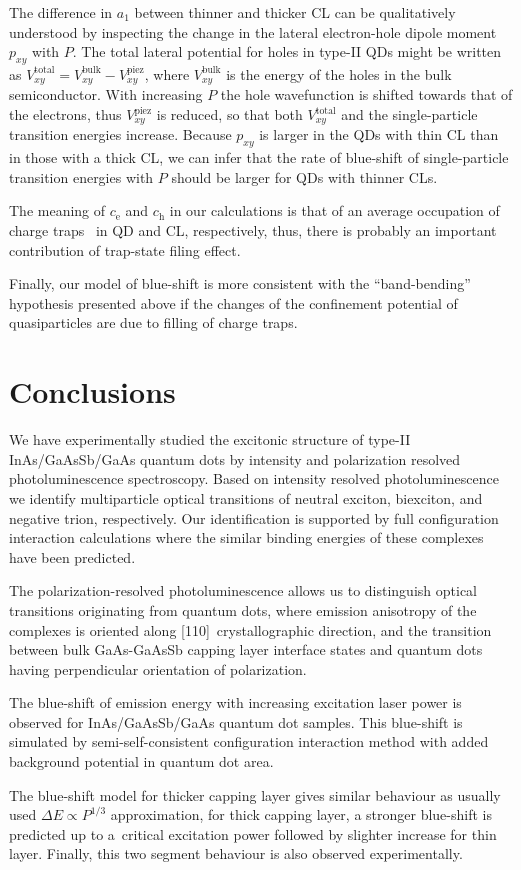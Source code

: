 The difference in $a_1$ between thinner and thicker CL can be qualitatively understood by inspecting the change in the lateral electron-hole dipole moment $p_{xy}$ with $P$. The total lateral potential for holes in type-II QDs might be written as $V_{xy}^\mathrm{total}=V_{xy}^\mathrm{bulk}-V^{\mathrm{piez}}_{xy}$, where $V^{\mathrm{bulk}}_{xy}$ is the energy of the holes in the bulk semiconductor. With increasing $P$ the hole wavefunction is shifted towards that of the electrons, thus $V^{\mathrm{piez}}_{xy}$ is reduced, so that both $V^{\mathrm{total}}_{xy}$ and the single-particle transition energies increase. Because $p_{xy}$ is larger in the QDs with thin CL than in those with a thick CL, we can infer that the rate of blue-shift of single-particle transition energies with $P$ should be larger for QDs with thinner CLs.

The meaning of $c_\mathrm{e}$ and $c_\mathrm{h}$ in our calculations is that of an average occupation of charge traps~\cite{Reimer2016} in QD and CL, respectively, thus, there is probably an important contribution of trap-state filing effect. 

Finally, our model of blue-shift is more consistent with the \enquote{band-bending} hypothesis presented above if the changes of the confinement potential of quasiparticles are due to filling of charge traps.

\section*{Conclusions}
We have experimentally studied the excitonic structure of type-II InAs/GaAsSb/GaAs quantum dots by intensity and polarization resolved photoluminescence spectroscopy. Based on intensity resolved photoluminescence we identify multiparticle optical transitions of neutral exciton, biexciton, and negative trion, respectively. Our identification is supported by full configuration interaction calculations where the similar binding energies of these complexes have been predicted. 

The polarization-resolved photoluminescence allows us to distinguish optical transitions originating from quantum dots, where emission anisotropy of the complexes is oriented along [110]~crystallographic direction, and the transition between bulk GaAs-GaAsSb capping layer interface states and quantum dots having perpendicular orientation of polarization.

The blue-shift of emission energy with increasing excitation laser power is observed for InAs/GaAsSb/GaAs quantum dot samples. This blue-shift is simulated by semi-self-consistent configuration interaction method with added background potential in quantum dot area.

The blue-shift model for thicker capping layer gives similar behaviour as usually used $\Delta E\propto P^{1/3}$ approximation, for thick capping layer, a stronger blue-shift is predicted up to a~critical excitation power followed by slighter increase for thin layer. Finally, this two segment behaviour is also observed experimentally.
\newpage